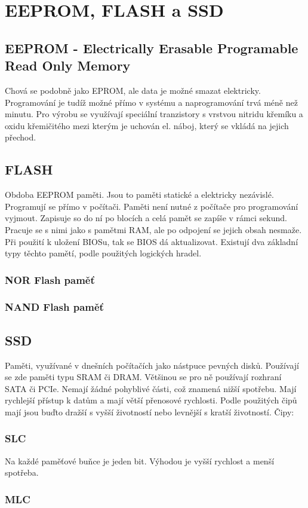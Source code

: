 \section{EEPROM, FLASH a SSD}
\subsection{EEPROM - Electrically Erasable Programable Read Only Memory}
Chová se podobně jako EPROM, ale data je možné smazat elektricky.
Programování je tudíž možné přímo v systému a naprogramování trvá méně než minutu.
Pro výrobu se využívají speciální tranzistory s vrstvou nitridu křemíku a oxidu křemičitého mezi kterým je uchován el. náboj, který se vkládá na jejich přechod.\\

\subsection{FLASH}
Obdoba EEPROM paměti.
Jsou to paměti statické a elektricky nezávislé.
Programují se přímo v počítači.
Paměti není nutné z počítače pro programování vyjmout.
Zapisuje so do ní po blocích a celá pamět se zapíše v rámci sekund.
Pracuje se s nimi jako s pamětmi RAM, ale po odpojení se jejich obsah nesmaže.
Při použití k uložení BIOSu, tak se BIOS dá aktualizovat.
Existují dva základní typy těchto pamětí, podle použitých logických hradel.
\subsubsection{NOR Flash paměť}

\subsubsection{NAND Flash paměť}
\subsection{SSD}
Paměti, využívané v dnešních počítačích jako nástpuce pevných disků.
Používají se zde paměti typu SRAM či DRAM.
Většinou se pro ně používají rozhraní SATA či PCIe.
Nemají žádné pohyblivé části, což znamená nižší spotřebu.
Mají rychlejší přístup k datům a mají větší přenosové rychlosti.
Podle použitých čipů mají jsou buďto dražší s vyšší životností nebo levnější s kratší životností.
Čipy:
\subsubsection{SLC}
Na každé paměťové buňce je jeden bit.
Výhodou je vyšší rychlost a menší spotřeba.
\subsubsection{MLC}
